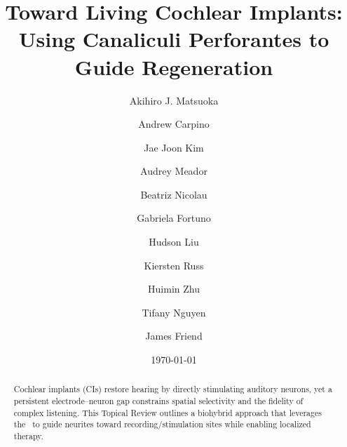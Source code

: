 \documentclass[preprint,aps,pra,floatfix]{revtex4-2}
\begin{document}
\title{Toward Living Cochlear Implants: Using Canaliculi Perforantes to Guide Regeneration}
\author{Akihiro J. Matsuoka}\author{Andrew Carpino}\author{Jae Joon Kim}\author{Audrey Meador}\author{Beatriz Nicolau}\author{Gabriela Fortuno}\author{Hudson Liu}\author{Kiersten Russ}\author{Huimin Zhu}\author{Tifany Nguyen}\author{James Friend}
\date{\today}
\begin{abstract}
Cochlear implants (CIs) restore hearing by directly stimulating auditory neurons, yet a persistent electrode--neuron gap constrains spatial selectivity and the fidelity of complex listening. This Topical Review outlines a biohybrid approach that leverages the \CPS\ to guide neurites toward recording/stimulation sites while enabling localized therapy.
\end{abstract}
\maketitle








\end{document}
